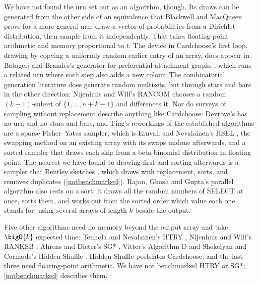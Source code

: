 \documentclass[letterpaper,11pt]{article}
\begin{document}
We have not found the urn set out as an algorithm, though. Its draws
can be generated from the other side of an equivalence that Blackwell
and MacQueen \cite{blackwellmacqueen} prove for a more general urn:
draw a vector of probabilities from a Dirichlet distribution, then
sample from it independently. That takes floating-point arithmetic and
memory proportional to \(t\). The device in Cardchoose's first loop,
drawing by copying a uniformly random earlier entry of an array, does
appear in Batagelj and Brandes's generator for preferential-attachment
graphs \cite{batageljbrandes}, which runs a related urn where each step
also adds a new colour. The combinatorial generation literature does generate random
multisets, but through stars and bars in the other direction:
Nijenhuis and Wilf's RANCOM \cite[Chapter 6]{nijenhuiswilf} chooses a
random \((k-1)\)-subset of \(\{1, \ldots, n+k-1\}\) and differences
it. Nor do surveys of sampling without replacement describe anything
like Cardchoose: Devroye's \cite[Chapter XII]{devroye} has no urn and
no stars and bars, and Ting's \cite{ting} reworkings of the
established algorithms are a sparse Fisher--Yates sampler, which is
Ernvall and Nevalainen's HSEL \cite{hsel}, the swapping method on an
existing array with its swaps undone afterwards, and a sorted sampler
that draws each skip from a beta-binomial distribution in floating
point. The nearest we have found to drawing first and sorting
afterwards is a sampler that Bentley sketches
\cite[\S 12.3]{pearls}, which draws with replacement, sorts, and
removes duplicates (\autoref{notbenchmarked}). Rajan, Ghosh and
Gupta's parallel algorithm \cite{rajan} also rests on a sort: it draws
all the random numbers of SELECT at once, sorts them, and works out
from the sorted order which value each one stands for, using several
arrays of length \(k\) beside the output.

Five other algorithms need no memory beyond the output array and take
\(\bigO{k}\) expected time: Teuhola and Nevalainen's HTRY
\cite{teuhola}, Nijenhuis and Wilf's RANKSB
\cite[Chapter 4]{nijenhuiswilf}, Ahrens and Dieter's SG*
\cite{ahrensd}, Vitter's Algorithm D and Shekelyan
and Cormode's Hidden Shuffle \cite{hiddenshuffle}. Hidden Shuffle
postdates Cardchoose, and the last three need floating-point arithmetic.
We have not benchmarked HTRY or SG*; \autoref{notbenchmarked} describes
them.
\end{document}
